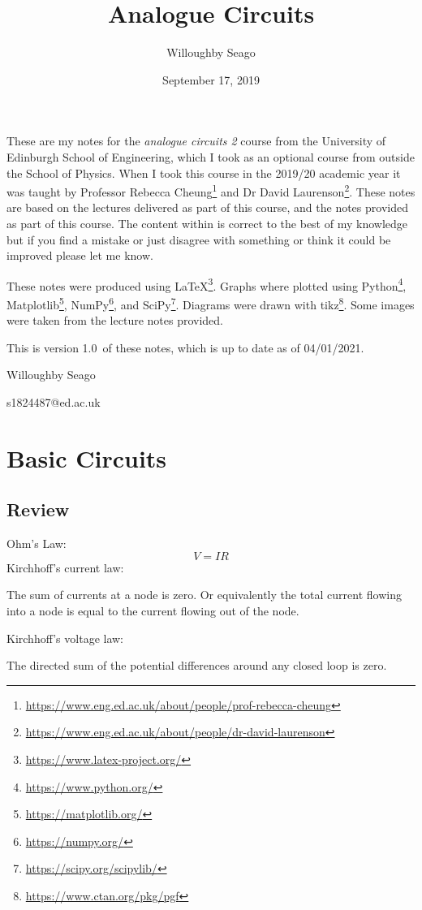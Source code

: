 \documentclass{article}
\title{Analogue Circuits}
\date{September 17, 2019}
\author{Willoughby Seago}
\newcommand{\notesVersion}{1.0}
\newcommand{\notesDate}{04/01/2021}
\begin{document}
    \maketitle
    These are my notes for the \textit{analogue circuits 2} course from the University of Edinburgh School of Engineering, which I took as an optional course from outside the School of Physics.
    When I took this course in the 2019/20 academic year it was taught by Professor Rebecca Cheung\footnote{\url{https://www.eng.ed.ac.uk/about/people/prof-rebecca-cheung}} and Dr David Laurenson\footnote{\url{https://www.eng.ed.ac.uk/about/people/dr-david-laurenson}}.
    These notes are based on the lectures delivered as part of this course, and the notes provided as part of this course.
    The content within is correct to the best of my knowledge but if you find a mistake or just disagree with something or think it could be improved please let me know.
    
    These notes were produced using \LaTeX\footnote{\url{https://www.latex-project.org/}}.
    Graphs where plotted using Python\footnote{\url{https://www.python.org/}}, Matplotlib\footnote{\url{https://matplotlib.org/}}, NumPy\footnote{\url{https://numpy.org/}}, and SciPy\footnote{\url{https://scipy.org/scipylib/}}.
    Diagrams were drawn with tikz\footnote{\url{https://www.ctan.org/pkg/pgf}}.
    Some images were taken from the lecture notes provided.
    
    This is version \notesVersion~of these notes, which is up to date as of \notesDate.
    \begin{flushright}
        Willoughby Seago
        
        s1824487@ed.ac.uk
    \end{flushright}
    \clearpage
    \tableofcontents
    \listoffigures
    \listoftables
    \clearpage
    
    \section{Basic Circuits}
    \subsection{Review}
    Ohm's Law:
    \[V = IR\]
    Kirchhoff's current law:
    \begin{displayquote}
        The sum of currents at a node is zero. Or equivalently the total current flowing into a node is equal to the current flowing out of the node.
    \end{displayquote}
    Kirchhoff's voltage law:
    \begin{displayquote}
        The directed sum of the potential differences around any closed loop is zero.
    \end{displayquote}
    
\end{document}
